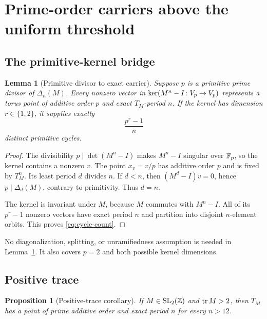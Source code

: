 \documentclass[11pt]{article}
\newtheorem{proposition}[theorem]{Proposition}
\newtheorem{lemma}[theorem]{Lemma}
\theoremstyle{definition}
\theoremstyle{remark}
\begin{document}
\section{Prime-order carriers above the uniform threshold}
\label{sec:uniform}

\subsection{The primitive-kernel bridge}

\begin{lemma}[Primitive divisor to exact carrier]
\label{lem:primitive-kernel}
Suppose \(p\) is a primitive prime divisor of \(\Delta_n(M)\).  Every
nonzero vector in \(\operatorname{ker}(M^n-I\colon V_p\to V_p)\) represents a torus point
of additive order \(p\) and exact \(T_M\)-period \(n\).  If the kernel has
dimension \(r\in\{1,2\}\), it supplies exactly
\begin{equation}
  \frac{p^r-1}{n}
  \label{eq:cycle-count}
\end{equation}
distinct primitive cycles.
\end{lemma}

\begin{proof}
The divisibility \(p\mid\det(M^n-I)\) makes \(M^n-I\) singular over
\(\mathbb{F}_p\), so the kernel contains a nonzero \(v\).  The point \(x_v=v/p\)
has additive order \(p\) and is fixed by \(T_M^n\).  Its least period
\(d\) divides \(n\).  If \(d<n\), then \((M^d-I)v=0\), hence
\(p\mid\Delta_d(M)\), contrary to primitivity.  Thus \(d=n\).

The kernel is invariant under \(M\), because \(M\) commutes with
\(M^n-I\).  All of its \(p^r-1\) nonzero vectors have exact period \(n\)
and partition into disjoint \(n\)-element orbits.  This proves
\eqref{eq:cycle-count}.
\end{proof}

No diagonalization, splitting, or unramifiedness assumption is needed in
Lemma~\ref{lem:primitive-kernel}.  It also covers \(p=2\) and both possible
kernel dimensions.

\subsection{Positive trace}

\begin{proposition}[Positive-trace corollary]
\label{prop:positive}
If \(M\in\mathrm{SL}_2(\mathbb{Z})\) and \(\operatorname{tr} M>2\), then \(T_M\) has a point of prime
additive order and exact period \(n\) for every \(n>12\).
\end{proposition}
\end{document}

